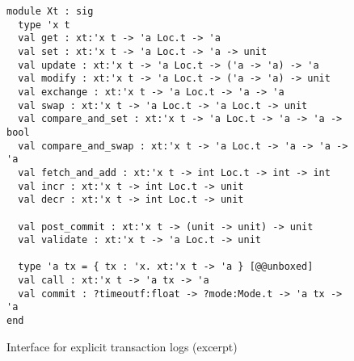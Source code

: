 \begin{figure}[tp]
\begin{verbatim}
module Xt : sig
  type 'x t
  val get : xt:'x t -> 'a Loc.t -> 'a
  val set : xt:'x t -> 'a Loc.t -> 'a -> unit
  val update : xt:'x t -> 'a Loc.t -> ('a -> 'a) -> 'a
  val modify : xt:'x t -> 'a Loc.t -> ('a -> 'a) -> unit
  val exchange : xt:'x t -> 'a Loc.t -> 'a -> 'a
  val swap : xt:'x t -> 'a Loc.t -> 'a Loc.t -> unit
  val compare_and_set : xt:'x t -> 'a Loc.t -> 'a -> 'a -> bool
  val compare_and_swap : xt:'x t -> 'a Loc.t -> 'a -> 'a -> 'a
  val fetch_and_add : xt:'x t -> int Loc.t -> int -> int
  val incr : xt:'x t -> int Loc.t -> unit
  val decr : xt:'x t -> int Loc.t -> unit
  
  val post_commit : xt:'x t -> (unit -> unit) -> unit
  val validate : xt:'x t -> 'a Loc.t -> unit
  
  type 'a tx = { tx : 'x. xt:'x t -> 'a } [@@unboxed]
  val call : xt:'x t -> 'a tx -> 'a
  val commit : ?timeoutf:float -> ?mode:Mode.t -> 'a tx -> 'a
end
\end{verbatim}
\caption{Interface for explicit transaction logs (excerpt)}
\label{fig:xt}
\end{figure}
